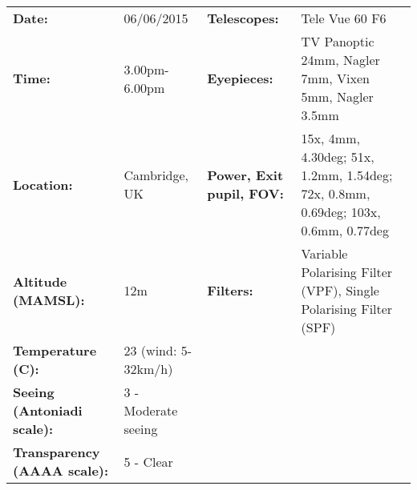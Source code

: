 \begin{tabular}{ p{1.7in} p{1.2in} p{1.5in} p{4.2in}}
{\bf Date:} & 06/06/2015 & {\bf Telescopes:} & Tele Vue 60 F6 \\ 
{\bf Time:} & 3.00pm-6.00pm & {\bf Eyepieces:} & TV Panoptic 24mm, Nagler 7mm, Vixen 5mm, Nagler 3.5mm \\ 
{\bf Location:} & Cambridge, UK & {\bf Power, Exit pupil, FOV:} & 15x, 4mm, 4.30deg; 51x, 1.2mm, 1.54deg; 72x, 0.8mm, 0.69deg; 103x, 0.6mm, 0.77deg \\ 
{\bf Altitude (MAMSL):} & 12m & {\bf Filters:} & Variable Polarising Filter (VPF), Single Polarising Filter (SPF) \\ 
{\bf Temperature (C):} & 23 (wind: 5-32km/h) & & \\ 
{\bf Seeing (Antoniadi scale):} & 3 - Moderate seeing & & \\ 
{\bf Transparency (AAAA scale):} & 5 - Clear & & \\ 
\end{tabular}
\centering 
